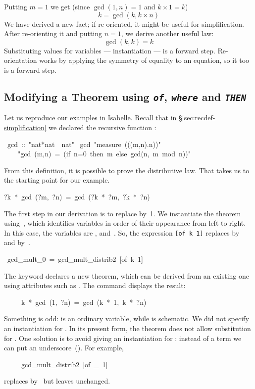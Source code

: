 Putting $m=1$ we get (since $\gcd(1,n)=1$ and $k\times1=k$) 
\[ k = \gcd(k,k\times n)\]
We have derived a new fact; if re-oriented, it might be
useful for simplification.  After re-orienting it and putting $n=1$, we
derive another useful law: 
\[ \gcd(k,k)=k \]
Substituting values for variables --- instantiation --- is a forward step. 
Re-orientation works by applying the symmetry of equality to 
an equation, so it too is a forward step.  

\subsection{Modifying a Theorem using {\tt\slshape of},  {\tt\slshape where}
 and {\tt\slshape THEN}}

Let us reproduce our examples in Isabelle.  Recall that in
{\S}\ref{sec:recdef-simplification} we declared the recursive function
:
\begin{isabelle}
\ gcd\ ::\ "nat*nat\ \isasymRightarrow\ nat"\isanewline
{}\ gcd\ "measure\ ((\isasymlambda(m,n).n))"\isanewline
\ \ \ \ "gcd\ (m,n)\ =\ (if\ n=0\ then\ m\ else\ gcd(n,\ m\ mod\ n))"
\end{isabelle}
%
From this definition, it is possible to prove the distributive law.  
That takes us to the starting point for our example.
\begin{isabelle}
?k\ *\ gcd\ (?m,\ ?n)\ =\ gcd\ (?k\ *\ ?m,\ ?k\ *\ ?n)
\end{isabelle}
%
The first step in our derivation is to replace  by~1.  We instantiate the
theorem using~, which identifies variables in order of their
appearance from left to right.  In this case, the variables  are , 
and~. So, the expression
\hbox{\texttt{[of k 1]}} replaces  by~ and 
by~.
\begin{isabelle}
\ gcd_mult_0\ =\ gcd_mult_distrib2\ [of\ k\ 1]
\end{isabelle}
%
The keyword  declares a new theorem, which can be derived
from an existing one using attributes such as \isa{[of~k~1]}.
The command 
displays the result:
\begin{isabelle}
\ \ \ \ \ k\ *\ gcd\ (1,\ ?n)\ =\ gcd\ (k\ *\ 1,\ k\ *\ ?n)
\end{isabelle}
Something is odd:  is an ordinary variable, while  
is schematic.  We did not specify an instantiation 
for .  In its present form, the theorem does not allow 
substitution for .  One solution is to avoid giving an instantiation for
: instead of a term we can put an underscore~(\isa{_}).  For example,
\begin{isabelle}
\ \ \ \ \ gcd_mult_distrib2\ [of\ _\ 1]
\end{isabelle}
replaces  by~ but leaves  unchanged.  

